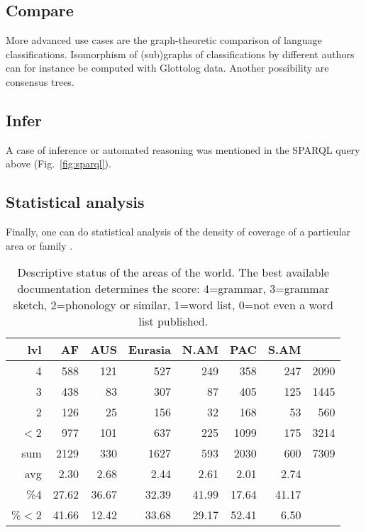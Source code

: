 \documentclass[10pt, a4paper]{article}
\begin{document}
\subsection{Compare}
More advanced use cases are the graph-theoretic comparison of language classifications. Isomorphism of (sub)graphs of classifications by different authors can for instance be computed with Glottolog data. Another possibility are consensus trees. 

\subsection{Infer}
A case of inference or automated reasoning was mentioned in the SPARQL query above (Fig.\ \ref{fig:sparql}). 
 

\subsection{Statistical analysis}
Finally, one can do statistical analysis of the density of coverage of a particular area or family \cite{HammarstroemEtAl2011Howmany,HammarstroemEtAl2012melanesia}. 



\begin{table} 
\centering
\tiny
\begin{tabular}{rrrrrrr|r}
lvl & AF & AUS & Eurasia & N.AM & PAC & S.AM & \\ 
\hline
4 & 588 & 121 & 527 & 249 & 358 & 247 & 2090 \\
3 & 438 & 83 & 307 & 87 & 405 & 125 & 1445 \\
2 & 126 & 25 & 156 & 32 & 168 & 53 & 560\\
$<$2 & 977 & 101 & 637 & 225 & 1099 & 175 & 3214\\
\hline sum 	& 2129 & 330 & 1627 & 593 & 2030 & 600 & 7309\\
\hline avg 	& 2.30 & 2.68 & 2.44 & 2.61 & 2.01 & 2.74\\
\hline \%4 & 27.62 & 36.67 & 32.39 & 41.99 & 17.64 & 41.17\\
\hline \%$<$2 & 41.66 & 12.42 & 33.68 & 29.17 & 52.41 & 6.50\\
\end{tabular}
\caption{Descriptive status of the areas of the world. The best available documentation determines the score: 4=grammar, 3=grammar sketch, 2=phonology or similar, 1=word list, 0=not even a word list published.}
\label{tab:stats}
\end{table}
\end{document}
